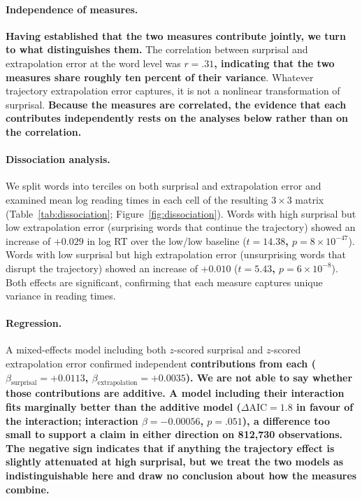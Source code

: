 \documentclass[12pt]{article}
\newcommand{\new}[1]{{\bfseries #1}}
\begin{document}
\paragraph{Independence of measures.} \new{Having established that the two measures contribute jointly, we turn to what distinguishes them.} The correlation between surprisal and extrapolation error at the word level was \new{$r = .31$, indicating that the two measures share roughly ten percent of their variance}. Whatever trajectory extrapolation error captures, it is not a nonlinear transformation of surprisal. \new{Because the measures are correlated, the evidence that each contributes independently rests on the analyses below rather than on the correlation.}

\paragraph{Dissociation analysis.} We split words into terciles on both surprisal and extrapolation error and examined mean log reading times in each cell of the resulting $3 \times 3$ matrix (Table~\ref{tab:dissociation}; Figure~\ref{fig:dissociation}). Words with high surprisal but low extrapolation error (surprising words that continue the trajectory) showed an increase of \new{$+0.029$} in log RT over the low/low baseline (\new{$t = 14.38$, $p = 8 \times 10^{-47}$}). Words with low surprisal but high extrapolation error (unsurprising words that disrupt the trajectory) showed an increase of \new{$+0.010$} (\new{$t = 5.43$, $p = 6 \times 10^{-8}$}). Both effects are significant, confirming that each measure captures unique variance in reading times.

\paragraph{Regression.} A mixed-effects model including both $z$-scored surprisal and $z$-scored extrapolation error confirmed independent \new{contributions from each ($\beta_{\text{surprisal}} = +0.0113$, $\beta_{\text{extrapolation}} = +0.0035$). We are not able to say whether those contributions are additive. A model including their interaction fits marginally better than the additive model ($\Delta\text{AIC} = 1.8$ in favour of the interaction; interaction $\beta = -0.00056$, $p = .051$), a difference too small to support a claim in either direction on 812,730 observations. The negative sign indicates that if anything the trajectory effect is slightly attenuated at high surprisal, but we treat the two models as indistinguishable here and draw no conclusion about how the measures combine.}
\end{document}
